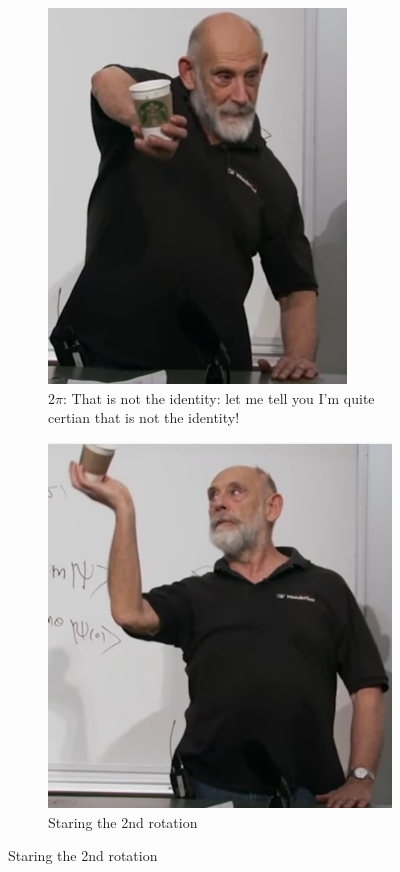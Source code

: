 \documentclass[]{article}
\begin{document}
\begin{figure}[H]
	\begin{subfigure}{0.45\textwidth}
		\caption{$2\pi$: That is not the identity: let me tell you I'm quite certian that is not the identity!}
		\includegraphics[width=\textwidth]{aqm-5-coffee-cup2}
	\end{subfigure}
	\begin{subfigure}{0.45\textwidth}
		\caption{Staring the 2nd rotation}
		\includegraphics[width=\textwidth]{aqm-5-coffee-cup3}

\end{subfigure}
\end{figure}
\end{document}
